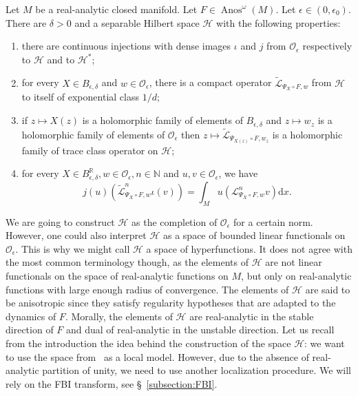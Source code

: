 \documentclass[AHL,Unicode,longabstracts,published]{cedram}
\DeclareMathOperator{\Anos}{Anos}
\newcommand{\p}[1]{\left(#1\right)}
\newcommand{\clO}{\mathcal{O}}
\newcommand{\clL}{\mathcal{L}}
\newcommand{\clH}{\mathcal{H}}
\newcommand{\bbN}{\mathbb{N}}
\newcommand{\bbR}{\mathbb{R}}
\newcommand{\rmd}{\mathrm{d}}
\newcommand*{\romanenumi}{\renewcommand*{\theenumi}{\roman{enumi}}}
\newcommand{\clO}{\mathcal{O}}
\begin{document}
\begin{theo}\label{theorem:anisotropic_space}
Let $M$ be a real-analytic closed manifold. Let $F \in \Anos^\omega(M)$. Let $\epsilon \in (0,\epsilon_0)$. There are $\delta > 0$ and a separable Hilbert space $\clH$ with the following properties:
\begin{enumerate}\romanenumi
\item\label{item:injections} there are continuous injections with dense images $\iota$ and $j$ from $\clO_\epsilon$ respectively to $\clH$ and to $\clH^*$; 
\item\label{item:extension_operator} for every $X \in B_{\epsilon,\delta}$ and $w \in \clO_\epsilon$, there is a compact operator $\widetilde{\clL}_{\Psi_X \circ F,w}$ from $\clH$ to itself of exponential class $1/d$; 
\item\label{item:holomorphic_family} if $z \mapsto X(z)$ is a holomorphic family of elements of $B_{\epsilon,\delta}$ and $z \mapsto w_z$ is a holomorphic family of elements of $\clO_\epsilon$ then $z \mapsto \widetilde{\clL}_{\Psi_{X(z)} \circ F,w_z}$ is a holomorphic family of trace class operator on $\clH$; 
\item\label{item:integrals} for every $X \in B_{\epsilon,\delta}^{\bbR}, w \in \clO_\epsilon, n \in \bbN$ and $u,v \in \clO_\epsilon$, we have
\begin{equation*}
j(u)\p{\widetilde{\clL}^n_{\Psi_X \circ F,w} \iota(v)} = \int_M u \p{\clL_{\Psi_X \circ F,w}^n v} \rmd x.
\end{equation*}
\end{enumerate}
\end{theo}

We are going to construct $\clH$ as the completion of $\clO_\epsilon$ for a certain norm. However, one could also interpret $\clH$ as a space of bounded linear functionals on $\clO_\epsilon$. This is why we might call $\clH$ a space of hyperfunctions. It does not agree with the most common terminology though, as the elements of $\clH$ are not linear functionals on the space of real-analytic functions on $M$, but only on real-analytic functions with large enough radius of convergence. The elements of $\clH$ are said to be anisotropic since they satisfy regularity hypotheses that are adapted to the dynamics of $F$. Morally, the elements of $\clH$ are real-analytic in the stable direction of $F$ and dual of real-analytic in the unstable direction. Let us recall from the introduction the idea behind the construction of the space $\clH$: we want to use the space from~\cite{faure_roy} as a local model. However, due to the absence of real-analytic partition of unity, we need to use another localization procedure. We will rely on the FBI transform, see \S~\ref{subsection:FBI}.
\end{document}
